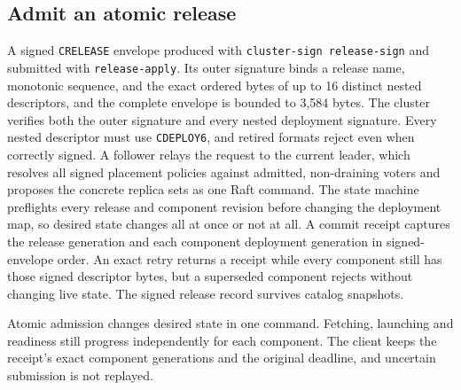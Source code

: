 \subsection{Admit an atomic release}

A signed \texttt{CRELEASE} envelope produced with
\texttt{cluster-sign release-sign} and submitted with
\texttt{release-apply}. Its outer signature binds a release name, monotonic
sequence, and the exact ordered bytes of up to 16 distinct nested descriptors, and
the complete envelope is bounded to 3,584 bytes. The cluster verifies both the
outer signature and every nested deployment signature. Every nested descriptor
must use \texttt{CDEPLOY6}, and retired formats reject even when correctly signed.
A follower relays the
request to the current leader, which resolves all signed placement policies
against admitted, non-draining voters and proposes the concrete replica sets
as one Raft command. The state machine preflights every
release and component revision before changing the deployment map, so desired
state changes all at once or not at all. A commit receipt captures the release
generation and each component deployment generation in signed-envelope order.
An exact retry returns a receipt while every component still has those signed
descriptor bytes, but a superseded component rejects without changing live state.
The signed release record survives catalog snapshots.

Atomic admission changes desired state in one command. Fetching, launching and
readiness still progress independently for each component. The client keeps
the receipt's exact component generations and the original deadline, and uncertain
submission is not replayed.

